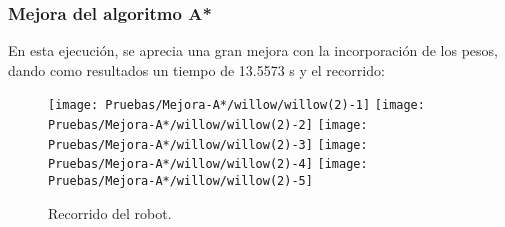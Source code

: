\documentclass[a4paper, 11pt]{article}
\begin{document}
		\subsubsection{Mejora del algoritmo A*}
			En esta ejecución, se aprecia una gran mejora con la incorporación de los pesos, dando como
			resultados un tiempo de 13.5573 s y el recorrido: 
			
			\begin{figure}[H]
				\centering
				\texttt{[image: Pruebas/Mejora-A*/willow/willow(2)-1]}
				\texttt{[image: Pruebas/Mejora-A*/willow/willow(2)-2]}
				\texttt{[image: Pruebas/Mejora-A*/willow/willow(2)-3]}
				\texttt{[image: Pruebas/Mejora-A*/willow/willow(2)-4]}
				\texttt{[image: Pruebas/Mejora-A*/willow/willow(2)-5]}
				\caption{Recorrido del robot.}
				\label{MA-wil}
			\end{figure}
	
\end{document}

